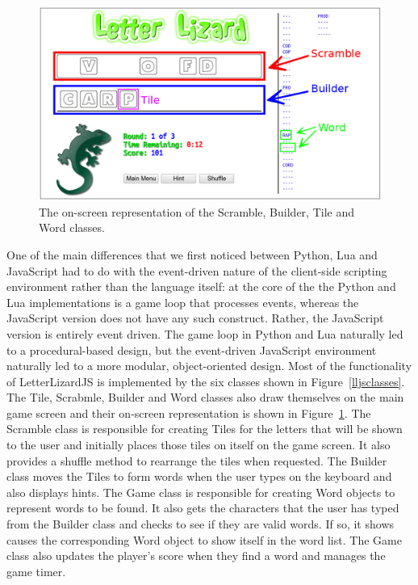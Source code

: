 \begin{figure}
    \centering
	\includegraphics[width=\textwidth]{../screenshots/LetterLizardJS-Legend.png}
	\caption{The on-screen representation of the Scramble, Builder, Tile and Word
	classes.}
	\label{lljslegend}
\end{figure}

One of the main differences that we first noticed between Python, Lua and 
JavaScript had to do with the event-driven nature of the client-side scripting
environment rather than the language itself: at the core of the the Python and
Lua implementations is a game loop that processes events, whereas the JavaScript
version does not have any such construct. Rather, the JavaScript version is
entirely event driven. The game loop in Python and Lua naturally led to a
procedural-based design, but the event-driven JavaScript environment
naturally led to a more modular, object-oriented design. Most of the functionality
of LetterLizardJS is implemented by the six classes shown in Figure~\ref{lljsclasses}.
The Tile, Scrabmle, Builder and Word classes also draw themselves on the main
game screen and their on-screen representation is shown in Figure~\ref{lljslegend}.
The Scramble class is responsible for creating Tiles for the letters that
will be shown to the user and initially places those tiles on itself on the
game screen. It also provides a shuffle method to rearrange the tiles when requested.
The Builder class moves the Tiles to form words when the user types on the keyboard
and also displays hints. The Game class is responsible for creating Word objects
to represent words to be found. It also gets the characters that the user has typed
from the Builder class and checks to see if they are valid words. If so, it shows
causes the corresponding Word object to show itself in the word list. The
Game class also updates the player's score when they find a word and manages
the game timer.

